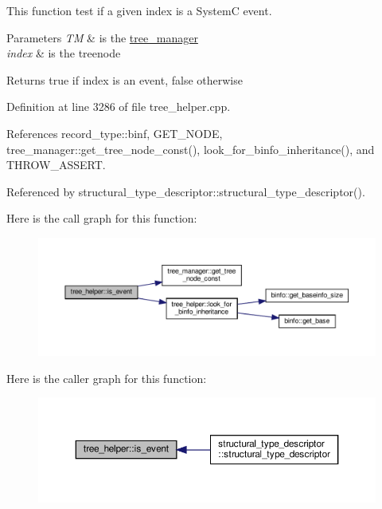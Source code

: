 This function test if a given index is a SystemC event. 


\begin{DoxyParams}{Parameters}
{\em TM} & is the \hyperlink{classtree__manager}{tree\+\_\+manager} \\
\hline
{\em index} & is the treenode \\
\hline
\end{DoxyParams}
\begin{DoxyReturn}{Returns}
true if index is an event, false otherwise 
\end{DoxyReturn}


Definition at line 3286 of file tree\+\_\+helper.\+cpp.



References record\+\_\+type\+::binf, G\+E\+T\+\_\+\+N\+O\+DE, tree\+\_\+manager\+::get\+\_\+tree\+\_\+node\+\_\+const(), look\+\_\+for\+\_\+binfo\+\_\+inheritance(), and T\+H\+R\+O\+W\+\_\+\+A\+S\+S\+E\+RT.



Referenced by structural\+\_\+type\+\_\+descriptor\+::structural\+\_\+type\+\_\+descriptor().

Here is the call graph for this function\+:
\nopagebreak
\begin{figure}[H]
\begin{center}
\leavevmode
\includegraphics[width=350pt]{d7/d99/classtree__helper_a0519f8236f1ff74d770b5d238d7c6c98_cgraph}
\end{center}
\end{figure}
Here is the caller graph for this function\+:
\nopagebreak
\begin{figure}[H]
\begin{center}
\leavevmode
\includegraphics[width=350pt]{d7/d99/classtree__helper_a0519f8236f1ff74d770b5d238d7c6c98_icgraph}
\end{center}
\end{figure}
\mbox{\label{classtree__helper_aa13e4e539150602fcb62d284869db494}} 
